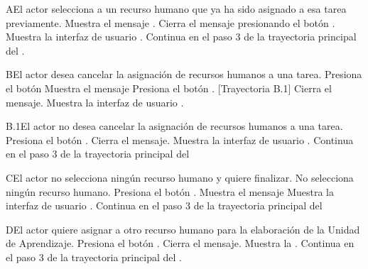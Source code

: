 \begin{UCtrayectoriaA}{A}{El actor selecciona a un recurso humano que ya ha sido asignado a esa tarea previamente.}
    \UCpaso Muestra el mensaje .
    \UCpaso[\UCactor] Cierra el mensaje presionando el botón .
    \UCpaso Muestra la interfaz de usuario .
    \UCpaso Continua en el paso 3 de la trayectoria principal del .
\end{UCtrayectoriaA}


\begin{UCtrayectoriaA}{B}{El actor desea cancelar la asignación de recursos humanos a una tarea.}
    \UCpaso[\UCactor] Presiona el botón 
    \UCpaso Muestra el mensaje 
    \UCpaso[\UCactor] Presiona el botón . [Trayectoria B.1]
    \UCpaso Cierra el mensaje.
    \UCpaso Muestra la interfaz de usuario .
\end{UCtrayectoriaA}


\begin{UCtrayectoriaA}{B.1}{El actor no desea cancelar la asignación de recursos humanos a una tarea.}
    \UCpaso[\UCactor] Presiona el botón .
    \UCpaso Cierra el mensaje.
    \UCpaso Muestra la interfaz de usuario .
    \UCpaso Continua en el paso 3 de la trayectoria principal del 
\end{UCtrayectoriaA}


\begin{UCtrayectoriaA}{C}{El actor no selecciona ningún recurso humano y quiere finalizar.}
    \UCpaso[\UCactor] No selecciona ningún recurso humano.
    \UCpaso[\UCactor] Presiona el botón .
    \UCpaso Muestra el mensaje 
    \UCpaso Muestra la interfaz de usuario .
    \UCpaso Continua en el paso 3 de la trayectoria principal del 
\end{UCtrayectoriaA}


\begin{UCtrayectoriaA}{D}{El actor quiere asignar a otro recurso humano para la elaboración de la Unidad de Aprendizaje.}
    \UCpaso[\UCactor] Presiona el botón .
    \UCpaso Cierra el mensaje.
    \UCpaso Muestra la .
    \UCpaso Continua en el paso 3 de la trayectoria principal del .
\end{UCtrayectoriaA}